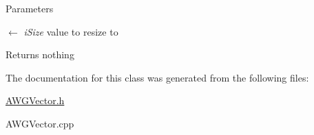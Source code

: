 \begin{DoxyParams}{Parameters}
\item[\mbox{$\leftarrow$} {\em iSize}]value to resize to \end{DoxyParams}
\begin{DoxyReturn}{Returns}
nothing 
\end{DoxyReturn}


The documentation for this class was generated from the following files:\begin{DoxyCompactItemize}
\item 
\hyperlink{AWGVector_8h}{AWGVector.h}\item 
AWGVector.cpp\end{DoxyCompactItemize}
